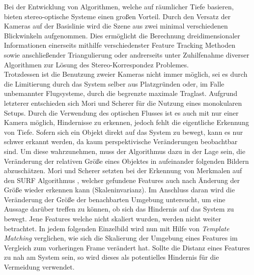 \noindent
Bei der Entwicklung von Algorithmen, welche auf räumlicher Tiefe basieren, bieten stereo-optische Systeme einen großen Vorteil. Durch den Versatz der Kameras auf der Basislinie wird die Szene aus zwei minimal verschiedenen Blickwinkeln aufgenommen. Dies ermöglicht die Berechnung dreidimensionaler Informationen einerseits mithilfe verschiedenster Feature Tracking Methoden sowie anschließender Triangulierung oder andrerseits unter Zuhilfenahme diverser Algorithmen zur Lösung des Stereo-Korrespondez Problemes.\\
\noindent
Trotzdessen ist die Benutzung zweier Kameras nicht immer möglich, sei es durch die Limitierung durch das System selber aus Platzgründen oder, im Falle unbemannter Flugsysteme, durch die begrenzte maximale Traglast. Aufgrund letzterer entschieden sich Mori und Scherer \cite{mori2013first} für die Nutzung eines monokularen Setups. Durch die Verwendung des optischen Flusses ist es auch mit nur einer Kamera möglich, Hindernisse zu erkennen, jedoch fehlt die eigentliche Erkennung von Tiefe. Sofern sich ein Objekt direkt auf das System zu bewegt, kann es nur schwer erkannt werden, da kaum perspektivische Veränderungen beobachtbar sind. Um diese wahrzunehmen, muss der Algorithmus dazu in der Lage sein, die Veränderung der relativen Größe eines Objektes in aufeinander folgenden Bildern abzuschätzen. Mori und Scherer setzten bei der Erkennung von Merkmalen auf den SURF Algorithmus \cite{bay2006surf}, welcher gefundene Features auch nach Änderung der Größe wieder erkennen kann (Skaleninvarianz). Im Anschluss daran wird die Veränderung der Größe der benachbarten Umgebung untersucht, um eine Aussage darüber treffen zu können, ob sich das Hindernis auf das System zu bewegt. Jene Features welche nicht skaliert wurden, werden nicht weiter betrachtet. In jedem folgenden Einzelbild wird nun mit Hilfe von \emph{Template Matching} verglichen, wie sich die Skalierung der Umgebung eines Features im Vergleich zum vorheringen Frame verändert hat. Sollte die Distanz eines Features zu nah am System sein, so wird dieses als potentielles Hindernis für die Vermeidung verwendet.

